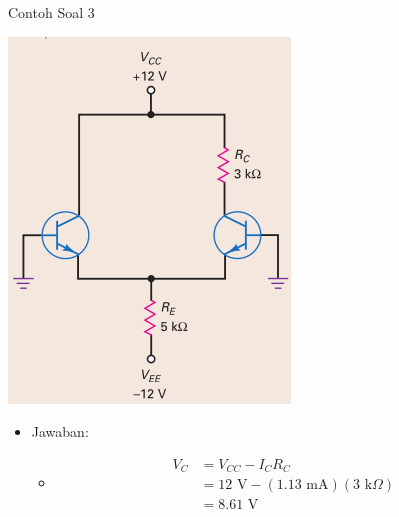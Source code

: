 \documentclass[aspectratio=169]{beamer}
\begin{document}
\begin{frame}{Contoh Soal 3}
	\begin{multicols}{2}
		\begin{center}
			\includegraphics[width=0.6\textheight]{gambar/01.diff-amp/01.latihan_soal_3}
		\end{center}
		\columnbreak
		\begin{itemize}
			\item Jawaban:
			\begin{itemize}
				\item[]
				\begin{align*}
					V_C &= V_{CC} - I_C R_C \\
					&= 12 \text{ V} - (1.13 \text{ mA})(3 \text{ k}\Omega) \\
					&= 8.61 \text{ V}
				\end{align*}
			\end{itemize}
		\end{itemize}
		\vfill\null
	\end{multicols}
\end{frame}
\end{document}
